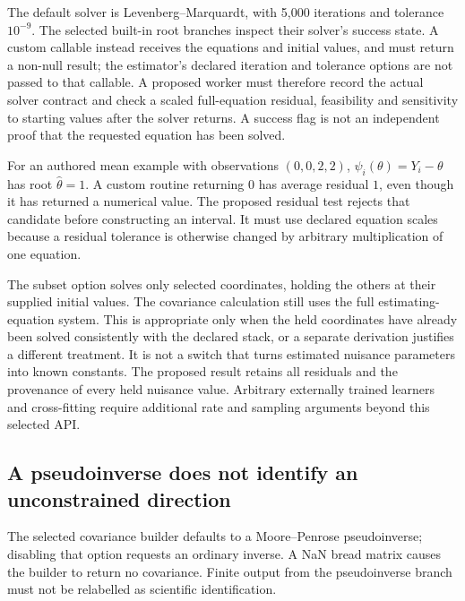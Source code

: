 The default solver is Levenberg--Marquardt, with 5,000 iterations and
tolerance $10^{-9}$. The selected built-in root branches inspect their
solver's success state. A custom callable instead receives the equations
and initial values, and must return a non-null result; the estimator's
declared iteration and tolerance options are not passed to that callable.
A proposed worker must therefore record the actual solver contract and
check a scaled full-equation residual, feasibility and sensitivity to
starting values after the solver returns. A success flag is not an
independent proof that the requested equation has been solved.
\citep{exec24_delicatessen_source,exec24_delicatessen_choice}

For an authored mean example with observations $(0,0,2,2)$,
$\psi_i(\theta)=Y_i-\theta$ has root $\widehat\theta=1$.
A custom routine returning $0$ has average residual $1$, even though
it has returned a numerical value. The proposed residual test rejects
that candidate before constructing an interval. It must use declared
equation scales because a residual tolerance is otherwise changed by
arbitrary multiplication of one equation.\citep{exec24_delicatessen_choice}

The subset option solves only selected coordinates, holding the others
at their supplied initial values. The covariance calculation still uses
the full estimating-equation system. This is appropriate only when the
held coordinates have already been solved consistently with the declared
stack, or a separate derivation justifies a different treatment. It is
not a switch that turns estimated nuisance parameters into known constants.
The proposed result retains all residuals and the provenance of every
held nuisance value. Arbitrary externally trained learners and cross-fitting
require additional rate and sampling arguments beyond this selected API.
\citep{exec24_delicatessen_source,exec24_delicatessen_choice}

\subsection{A pseudoinverse does not identify an unconstrained direction}
The selected covariance builder defaults to a Moore--Penrose pseudoinverse;
disabling that option requests an ordinary inverse. A NaN bread matrix
causes the builder to return no covariance. Finite output from the
pseudoinverse branch must not be relabelled as scientific identification.
\citep{exec24_delicatessen_source}

